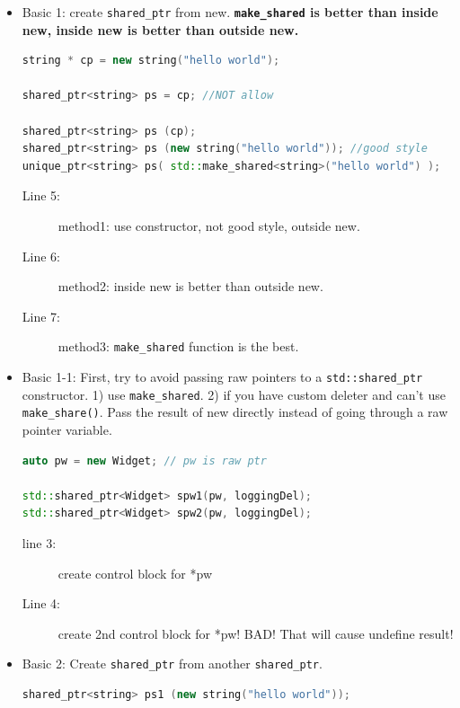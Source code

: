 \documentclass[a4paper,11pt,twoside]{book}
\begin{document}
\begin{itemize}
\begin{enumerate}
\end{enumerate}

	
\item Basic 1: create \texttt{shared\_ptr} from new. \textbf{\texttt{make\_shared} is better than inside new, inside new is better than outside new.}
\begin{lstlisting}[frame=single, language=c++]
string * cp = new string("hello world");

shared_ptr<string> ps = cp; //NOT allow

shared_ptr<string> ps (cp); 
shared_ptr<string> ps (new string("hello world")); //good style
unique_ptr<string> ps( std::make_shared<string>("hello world") );
\end{lstlisting}
\begin{description}
	\item[Line 5:] method1: use constructor, not good style, outside new.
	\item[Line 6:] method2: inside new is better than outside new.
	\item[Line 7:] method3: \texttt{make\_shared} function is the best.
\end{description}

\item Basic 1-1: First, try to avoid passing raw pointers to a \texttt{std::shared\_ptr} constructor. 1) use \texttt{make\_shared}. 2) if you have custom deleter and can't use \texttt{make\_share()}.  Pass the result of new directly instead of going through a raw pointer variable.

\begin{lstlisting}[frame=single, language=c++]
auto pw = new Widget; // pw is raw ptr

std::shared_ptr<Widget> spw1(pw, loggingDel);
std::shared_ptr<Widget> spw2(pw, loggingDel);
\end{lstlisting}
\begin{description}
	\item[line 3:] create control block for *pw
	\item[Line 4:] create 2nd control block for *pw! BAD! That will cause undefine result!
\end{description}

\item Basic 2: Create \texttt{shared\_ptr} from another \texttt{shared\_ptr}.
\begin{lstlisting}[frame=single, language=c++, mathescape=true]
shared_ptr<string> ps1 (new string("hello world"));


\end{lstlisting}
\end{itemize}
\end{document}
